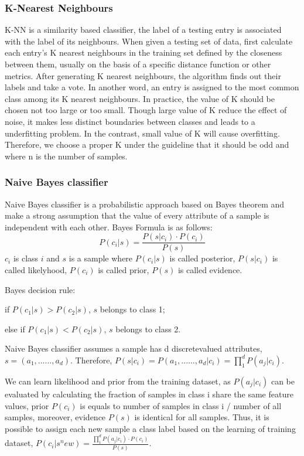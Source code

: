 \documentclass[conference]{IEEEtran}
\begin{document}
\subsubsection{K-Nearest Neighbours}
K-NN is a similarity based classifier, the label of a testing entry is associated with the label of its neighbours. When given a testing set of data, first calculate each entry’s K nearest neighbours in the training set defined by the closeness between them, usually on the basis of a specific distance function or other metrics. After generating K nearest neighbours, the algorithm finds out their labels and take a vote. In another word, an entry is assigned to the most common class among its K nearest neighbours. 
In practice, the value of K should be chosen not too large or too small. Though large value of K reduce the effect of noise, it makes less distinct boundaries between classes and leads to a underfitting problem. In the contrast, small value of K will cause overfitting. Therefore, we choose a proper K under the guideline that it should be odd and  where n is the number of samples.

\subsubsection{Naive Bayes classifier}
Naive Bayes classifier is a probabilistic approach based on Bayes theorem and make a strong assumption that the value of every attribute of a sample is independent with each other. Bayes Formula is as follows: 
\begin{equation}
P(c_i|s) = \frac{P(s|c_i) \cdot P(c_i)}{P(s)}
\end{equation}
$c_i$ is class $i$ and $s$ is a sample
where $P(c_i|s)$ is called posterior, $P(s|c_i)$ is called likelyhood, $P(c_i)$ is called prior, $P(s)$ is called evidence.

Bayes decision rule:

if $P(c_1|s) > P(c_2|s)$, $s$ belongs to class 1;

else if $P(c_1|s) < P(c_2|s)$, $s$ belongs to class 2. 

Naive Bayes classifier assumes a sample has d discrete­valued attributes, $s = (a_1, ......, a_d)$. Therefore, $P(s|c_i) = P(a_1, ......, a_d|c_i) = \prod^d_1P(a_j|c_i)$.

We can learn likelihood and prior from the training dataset, as $P(a_j|c_i)$ can be evaluated by calculating the fraction of samples in class i share the same feature values, prior $P(c_i)$ is equals to number of samples in class i / number of all samples, moreover, evidence $P(s)$ is identical for all samples. Thus, it is possible to assign each new sample a class label based
on the learning of training dataset, $P(c_i|s^new) = \frac{\prod^d_1 P(a_j|c_i) \cdot P(c_i)}{P(s)}$.
\end{document}
